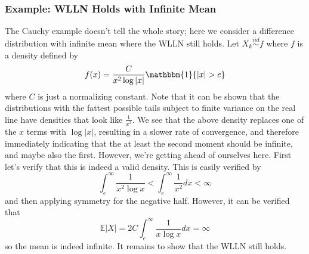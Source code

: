 \documentclass[12pt]{article}
\newcommand*{\abs}[1]{\left\lvert#1\right\rvert}
\newcommand{\E}{\mathbb{E}}
\begin{document}
\subsubsection{Example: WLLN Holds with Infinite Mean}
The Cauchy example doesn't tell the whole story; here we consider a difference distribution with infinite mean where the WLLN still holds. Let $X_k \overset{iid}{\sim} f$ where $f$ is a density defined by 
\[f(x) = \frac{C}{x^2 \log \abs{x}} \mathbbm{1}\{\abs{x} > e\}\]
where $C$ is just a normalizing constant. Note that it can be shown that the distributions with the fattest possible tails subject to finite variance on the real line have densities that look like $\frac{1}{x^3}$. We see that 
the above density replaces one of the $x$ terms with $\log \abs{x}$, resulting in a slower rate of convergence, and therefore immediately indicating that the at least the second moment should be infinite, and maybe also the 
first. However, we're getting ahead of ourselves here. First let's verify that this is indeed a valid density. This is easily verified by 
\[\int_{e}^{\infty} \frac{1}{x^2 \log x} < \int_{e}^{\infty} \frac{1}{x^2} dx < \infty\]
and then applying symmetry for the negative half. However, it can be verified that 
\[\E\abs{X} = 2C \int_{e}^{\infty} \frac{1}{x\log x} dx = \infty\]
so the mean is indeed infinite. It remains to show that the WLLN still holds. 
\end{document}

